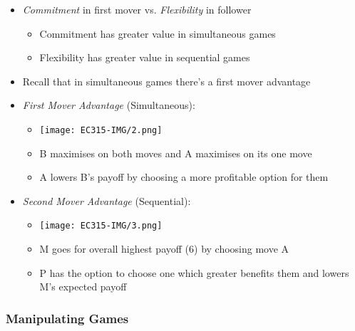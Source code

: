 \documentclass[11pt, english]{article}
\begin{document}
	\begin{itemize}
	\setlength\itemsep{0cm}
		\item \textit{Commitment} in first mover vs. \textit{Flexibility} in follower
		\begin{itemize}
			\item Commitment has greater value in simultaneous games 
			\item Flexibility has greater value in sequential games
		\end{itemize}
		\item Recall that in simultaneous games there's a first mover advantage
		\item \textit{First Mover Advantage} (Simultaneous):
		\begin{itemize}
			\item \begin{center}\texttt{[image: EC315-IMG/2.png]}\end{center}
			\item B maximises on both moves and A maximises on its one move
			\item A lowers B's payoff by choosing a more profitable option for them
		\end{itemize}
		\item \textit{Second Mover Advantage} (Sequential):
			\begin{itemize}                      
                        \item \begin{center}\texttt{[image: EC315-IMG/3.png]}\end{center}
                        \item M goes for overall highest payoff (6) by choosing move A
                        \item P has the option to choose one which greater benefits them and lowers M's expected payoff
                \end{itemize}
	\end{itemize}

		\subsubsection{Manipulating Games}
\end{document}
